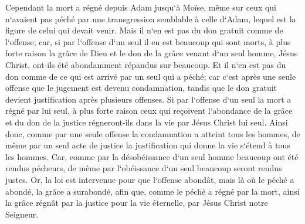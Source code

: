 \verse Cependant la mort a régné depuis Adam jusqu`à Moïse, même sur ceux qui n`avaient pas péché par une transgression semblable à celle d`Adam, lequel est la figure de celui qui devait venir. 
\verse Mais il n`en est pas du don gratuit comme de l`offense; car, si par l`offense d`un seul il en est beaucoup qui sont morts, à plus forte raison la grâce de Dieu et le don de la grâce venant d`un seul homme, Jésus Christ, ont-ils été abondamment répandus sur beaucoup. 
\verse Et il n`en est pas du don comme de ce qui est arrivé par un seul qui a péché; car c`est après une seule offense que le jugement est devenu condamnation, tandis que le don gratuit devient justification après plusieurs offenses. 
\verse Si par l`offense d`un seul la mort a régné par lui seul, à plus forte raison ceux qui reçoivent l`abondance de la grâce et du don de la justice régneront-ils dans la vie par Jésus Christ lui seul. 
\verse Ainsi donc, comme par une seule offense la condamnation a atteint tous les hommes, de même par un seul acte de justice la justification qui donne la vie s`étend à tous les hommes. 
\verse Car, comme par la désobéissance d`un seul homme beaucoup ont été rendus pécheurs, de même par l`obéissance d`un seul beaucoup seront rendus justes. 
\verse Or, la loi est intervenue pour que l`offense abondât, mais là où le péché a abondé, la grâce a surabondé, 
\verse afin que, comme le péché a régné par la mort, ainsi la grâce régnât par la justice pour la vie éternelle, par Jésus Christ notre Seigneur. 

